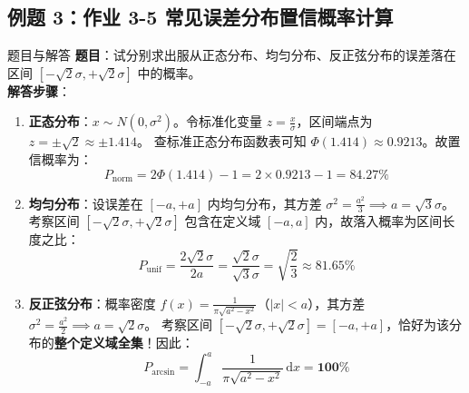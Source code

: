 \documentclass[11pt,a4paper]{ctexart}
\begin{document}
\subsection{例题 3：作业 3-5 常见误差分布置信概率计算}
\begin{solbox}{题目与解答}
\textbf{题目}：试分别求出服从正态分布、均匀分布、反正弦分布的误差落在区间 $[-\sqrt{2}\sigma, +\sqrt{2}\sigma]$ 中的概率。\\[0.5em]
\textbf{解答步骤}：
\begin{enumerate}
    \item \textbf{正态分布}：$x \sim N(0, \sigma^2)$。令标准化变量 $z = \frac{x}{\sigma}$，区间端点为 $z = \pm \sqrt{2} \approx \pm 1.414$。
    查标准正态分布函数表可知 $\Phi(1.414) \approx 0.9213$。故置信概率为：
    $$P_{\text{norm}} = 2\Phi(1.414) - 1 = 2 \times 0.9213 - 1 = \mathbf{84.27\%}$$
    \item \textbf{均匀分布}：设误差在 $[-a, +a]$ 内均匀分布，其方差 $\sigma^2 = \frac{a^2}{3} \implies a = \sqrt{3}\sigma$。
    考察区间 $[-\sqrt{2}\sigma, +\sqrt{2}\sigma]$ 包含在定义域 $[-a, a]$ 内，故落入概率为区间长度之比：
    $$P_{\text{unif}} = \frac{2\sqrt{2}\sigma}{2a} = \frac{\sqrt{2}\sigma}{\sqrt{3}\sigma} = \sqrt{\frac{2}{3}} \approx \mathbf{81.65\%}$$
    \item \textbf{反正弦分布}：概率密度 $f(x) = \frac{1}{\pi\sqrt{a^2 - x^2}}$（$|x| < a$），其方差 $\sigma^2 = \frac{a^2}{2} \implies a = \sqrt{2}\sigma$。
    考察区间 $[-\sqrt{2}\sigma, +\sqrt{2}\sigma] = [-a, +a]$，恰好为该分布的\textbf{整个定义域全集}！因此：
    $$P_{\text{arcsin}} = \int_{-a}^a \frac{1}{\pi\sqrt{a^2 - x^2}}\,\mathrm{d}x = \mathbf{100\%}$$
\end{enumerate}
\end{solbox}
\end{document}

